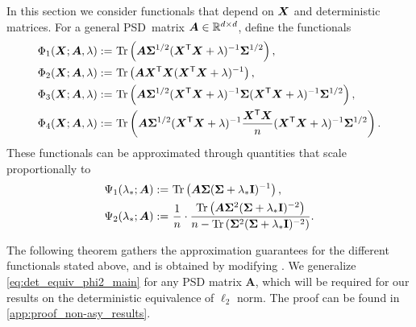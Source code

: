 In this section we consider functionals that depend on ${\boldsymbol X}$ and deterministic matrices. For a general PSD~matrix ${\boldsymbol A} \in \mathbb{R}^{d\times d}$, define the functionals
\begin{align}
    \Phi_1({\boldsymbol X}; {\boldsymbol A}, \lambda) :=&~ {\rm Tr} \left({\boldsymbol A} {\boldsymbol \Sigma}^{1/2} ({\boldsymbol X}^{\mathsf T} {\boldsymbol X} + \lambda)^{-1} {\boldsymbol \Sigma}^{1/2}\right),\label{eq:Phi_1}\\
    \Phi_2({\boldsymbol X}; {\boldsymbol A}, \lambda) :=&~ {\rm Tr} \left({\boldsymbol A}{\boldsymbol X}^{\mathsf T} {\boldsymbol X} ({\boldsymbol X}^{\mathsf T} {\boldsymbol X} + \lambda)^{-1}\right),\label{eq:Phi_2}\\
    \Phi_3({\boldsymbol X}; {\boldsymbol A}, \lambda) :=&~ {\rm Tr} \left({\boldsymbol A} {\boldsymbol \Sigma}^{1/2} ({\boldsymbol X}^{\mathsf T} {\boldsymbol X} + \lambda)^{-1} {\boldsymbol \Sigma} ({\boldsymbol X}^{\mathsf T} {\boldsymbol X} + \lambda)^{-1} {\boldsymbol \Sigma}^{1/2}\right),\label{eq:Phi_3}\\
    \Phi_4({\boldsymbol X}; {\boldsymbol A}, \lambda) :=&~ {\rm Tr} \left({\boldsymbol A} {\boldsymbol \Sigma}^{1/2} ({\boldsymbol X}^{\mathsf T} {\boldsymbol X} + \lambda)^{-1} \frac{{\boldsymbol X}^{\mathsf T} {\boldsymbol X}}{n} ({\boldsymbol X}^{\mathsf T} {\boldsymbol X} + \lambda)^{-1} {\boldsymbol \Sigma}^{1/2}\right).\label{eq:Phi_4}
\end{align}
These functionals can be approximated through quantities that scale proportionally to
\begin{align}
    \Psi_1(\lambda_*; {\boldsymbol A}) :=&~ {\rm Tr}\left({\boldsymbol A} {\boldsymbol \Sigma} ({\boldsymbol \Sigma} + \lambda_*{\mathbf I})^{-1}\right),\label{eq:Psi_1}\\
    \Psi_2(\lambda_*; {\boldsymbol A}) :=&~ \frac{1}{n} \cdot \frac{{\rm Tr}\left({\boldsymbol A} {\boldsymbol \Sigma}^2 ({\boldsymbol \Sigma} + \lambda_*{\mathbf I})^{-2}\right)}{n - {\rm Tr}\left({\boldsymbol \Sigma}^2 ({\boldsymbol \Sigma} + \lambda_*{\mathbf I})^{-2}\right)}.\label{eq:Psi_2}
\end{align}



The following theorem gathers the approximation guarantees for the different functionals stated above, and is obtained by modifying \citet[Theorem A.2]{defilippis2024dimension}. 
We generalize \cref{eq:det_equiv_phi2_main} for any PSD matrix $\bm A$, which will be required for our results on the deterministic equivalence of $\ell_2$ norm. The proof can be found in \cref{app:proof_non-asy_results}.

